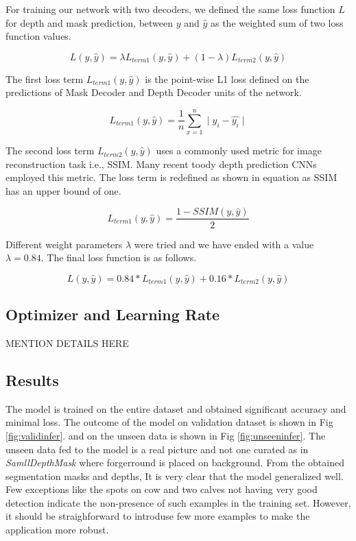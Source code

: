 \documentclass[review]{cvpr}
\begin{document}
For training our network with two decoders, we defined the same loss function $L$ for depth and mask prediction, between $y$ and $\hat{y}$ as the weighted sum of two loss function values.

\begin{equation}
L(y, \hat{y}) = \lambda L_{term1}(y, \hat{y}) + (1 - \lambda) L_{term2}(y, \hat{y})
\end{equation}

The first loss term $L_{term1}(y, \hat{y})$ is the point-wise L1 loss defined on the predictions of Mask Decoder and  
Depth Decoder units of the network.

\begin{equation}
L_{term1}(y, \hat{y}) = \frac{1}{n} \sum_{x=1}^{n} \mid y_i - \hat{y_i} \mid
\end{equation}

The second loss term $L_{term2}(y, \hat{y})$ uses a commonly used metric for image reconstruction task i.e., SSIM. 
Many recent toody depth prediction CNNs employed this metric. 
The loss term is redefined as shown in equation as SSIM has an upper bound of one.

\begin{equation}
L_{term1}(y, \hat{y}) = \frac{1 - SSIM(y, \hat{y})}{2}
\end{equation}

Different weight parameters $\lambda$ were tried and we have ended with a value $\lambda = 0.84$. The final loss function is as follows.

\begin{equation}
L(y, \hat{y}) = 0.84 \ast L_{term1}(y, \hat{y}) + 0.16 \ast L_{term2}(y, \hat{y})
\end{equation}

\subsection{Optimizer and Learning Rate}
MENTION DETAILS HERE

\subsection{Results}
The model is trained on the entire dataset and obtained significant accuracy and minimal loss. The outcome of the model on validation dataset is shown in Fig \ref{fig:validinfer}. and on the unseen data is shown in Fig \ref{fig:unseeninfer}. The unseen data fed to the model is a real picture and not one curated as in \textit{SamllDepthMask} where forgerround is placed on background. From the obtained segmentation masks and depths, It is very clear that the model generalized well. Few exceptions like the spots on cow and two calves not having very good detection indicate the non-presence of such examples in the training set. However, it should be straighforward to introduse few more examples to make the application more robust.
\end{document}
